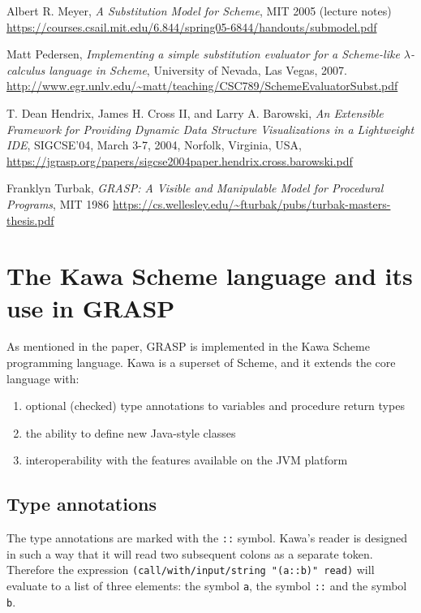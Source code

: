 \documentclass[acmsmall]{acmart}
\begin{document}
\begin{thebibliography}{12}
 Albert R. Meyer, \emph{A Substitution Model for Scheme},
  MIT 2005 (lecture notes) \\
  \url{https://courses.csail.mit.edu/6.844/spring05-6844/handouts/submodel.pdf}
  
 Matt Pedersen, \emph{Implementing a simple
substitution evaluator for a Scheme-like $\lambda$-calculus language
in Scheme}, University of Nevada, Las Vegas, 2007. \\
  \url{http://www.egr.unlv.edu/~matt/teaching/CSC789/SchemeEvaluatorSubst.pdf}
  
 T. Dean Hendrix, James H. Cross II, and Larry
  A. Barowski, \emph{An Extensible Framework for Providing Dynamic
  Data Structure Visualizations in a Lightweight IDE},  SIGCSE'04,
  March 3-7, 2004, Norfolk, Virginia, USA,
  \url{https://jgrasp.org/papers/sigcse2004paper.hendrix.cross.barowski.pdf}
  
 Franklyn Turbak, \emph{GRASP: A Visible and
Manipulable Model for Procedural Programs}, MIT 1986
  \url{https://cs.wellesley.edu/~fturbak/pubs/turbak-masters-thesis.pdf}

\end{thebibliography}

\appendix
\section{The Kawa Scheme language and its use in GRASP}

As mentioned in the paper, GRASP is implemented in the Kawa Scheme programming language.
Kawa is a superset of Scheme, and it extends the core language with:
\begin{enumerate}
\item optional (checked) type annotations to variables and procedure return types
\item the ability to define new Java-style classes
\item interoperability with the features available on the JVM platform
\end{enumerate}

\subsection*{Type annotations}

The type annotations are marked with the \texttt{::} symbol. Kawa's
reader is designed in such a way that it will read two subsequent
colons as a separate token. Therefore the expression
\texttt{(call\-/with\-/input\-/string "(a::b)" read)} will evaluate
to a list of three elements: the symbol \texttt{a}, the symbol
\texttt{::} and the symbol \texttt{b}.
\end{document}
